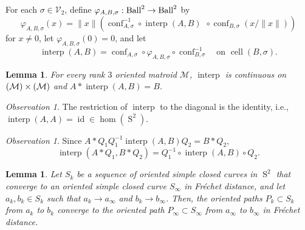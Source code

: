 \documentclass[11pt]{article}
\newcommand{\ie}{i.e.,\xspace}
\numberwithin{equation}{section}
\newtheorem{lemma}[theorem]{Lemma}
\theoremstyle{remark}
\newtheorem{observation}[theorem]{Observation}
\let\mc\mathcal
\let\phi\varphi
\DeclareMathOperator{\sphere}{S}
\DeclareMathOperator{\cell}{cell}
\DeclareMathOperator{\conf}{conf}
\newcommand{\Ball}{\text{\rm Ball}}
\DeclareMathOperator{\interp}{interp}
\DeclareMathOperator{\id}{id}
\begin{document}
For each $\sigma \in \mc{V}_{2}$, define
$ \phi_{A,B,\sigma} : \Ball^2 \to \Ball^2 $ by\vspace*{-3pt}
\[ \phi_{A,B,\sigma}(x) = \|x\| \left(\conf_{A,\sigma}^{-1} \circ \interp(A,B)^{\phantom1} \circ \conf_{B,\sigma}^{\phantom1}(x/\|x\|) \right) \]
for $x \neq 0$, let $\phi_{A,B,\sigma}(0)=0$,
and let\vspace*{-3pt}
\[ \interp(A,B) = \conf_{A,\sigma}^{\phantom1} \circ \phi_{A,B,\sigma}^{\phantom1} \circ \conf_{B,\sigma}^{-1} \quad
\text{on } \cell(B,\sigma).\]

\begin{lemma}\label{lemma-interp}
For every rank $3$ oriented matroid $\mc{M}$, $\interp$ is continuous on \hbox{$\real(\mc{M}) \times \real(\mc{M})$} and $A* \interp(A,B) = B$.
\end{lemma}

\begin{observation}\label{observation-interp-id}
The restriction of $\interp$ to the diagonal is the identity, \ie $\interp(A,A) = \id \in \hom(\sphere^2)$.
\end{observation}

\begin{observation}\label{observation-orthinterp}
Since $A*Q_1Q_1^{-1} \interp(A,B) Q_2 = B*Q_2 $,\vspace*{-3pt}
\[ \interp(A*Q_1,B*Q_2) = Q_1^{-1} \circ \interp(A,B) \circ Q_2. \]
\end{observation}

\begin{lemma}\label{lemma-path}
Let $S_k$ be a sequence of oriented simple closed curves in $\sphere^2$ that converge to an oriented simple closed curve $S_\infty$ in Fréchet distance, and let $a_k,b_k \in S_k$ such that $a_k \to a_\infty$ and $b_k \to b_\infty$. Then, the oriented paths $P_k \subset S_k$ from $a_k$ to $b_k$ converge to the oriented path $P_\infty \subset S_\infty$ from $a_\infty$ to $b_\infty$ in Fréchet distance.
\end{lemma}
\end{document}
